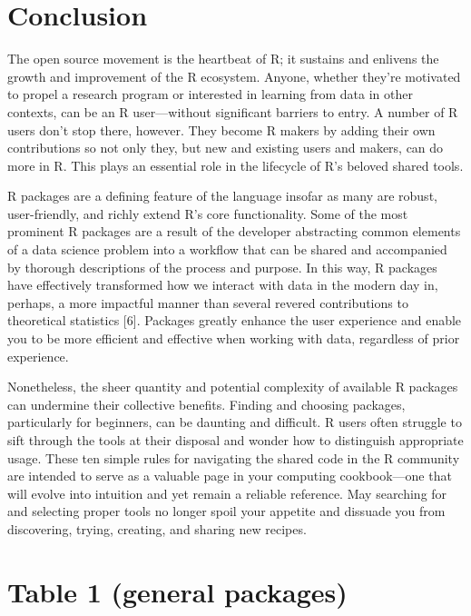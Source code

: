 \documentclass[10pt,letterpaper]{article}
\begin{document}
\hypertarget{conclusion}{%
\section{Conclusion}\label{conclusion}}

The open source movement is the heartbeat of R; it sustains and enlivens
the growth and improvement of the R ecosystem. Anyone, whether they're
motivated to propel a research program or interested in learning from
data in other contexts, can be an R user---without significant barriers
to entry. A number of R users don't stop there, however. They become R
makers by adding their own contributions so not only they, but new and
existing users and makers, can do more in R. This plays an essential
role in the lifecycle of R's beloved shared tools.

R packages are a defining feature of the language insofar as many are
robust, user-friendly, and richly extend R's core functionality. Some of
the most prominent R packages are a result of the developer abstracting
common elements of a data science problem into a workflow that can be
shared and accompanied by thorough descriptions of the process and
purpose. In this way, R packages have effectively transformed how we
interact with data in the modern day in, perhaps, a more impactful
manner than several revered contributions to theoretical statistics
{[}6{]}. Packages greatly enhance the user experience and enable you to
be more efficient and effective when working with data, regardless of
prior experience.

Nonetheless, the sheer quantity and potential complexity of available R
packages can undermine their collective benefits. Finding and choosing
packages, particularly for beginners, can be daunting and difficult. R
users often struggle to sift through the tools at their disposal and
wonder how to distinguish appropriate usage. These ten simple rules for
navigating the shared code in the R community are intended to serve as a
valuable page in your computing cookbook---one that will evolve into
intuition and yet remain a reliable reference. May searching for and
selecting proper tools no longer spoil your appetite and dissuade you
from discovering, trying, creating, and sharing new recipes.

\hypertarget{table-1-general-packages}{%
\section{Table 1 (general packages)}\label{table-1-general-packages}}
\end{document}
